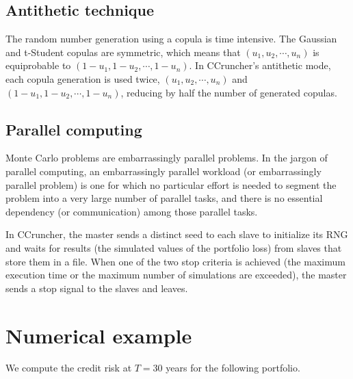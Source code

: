 \documentclass[a4paper,12pt,final]{article}
\begin{document}
\subsection{Antithetic technique}
The random number generation using a copula is time intensive. The Gaussian and 
t-Student copulas are symmetric, which means that $(u_1, u_2, \cdots, u_n)$ is 
equiprobable to $(1-u_1, 1-u_2, \cdots, 1-u_n)$. In CCruncher's antithetic mode, 
each copula generation is used twice, $(u_1, u_2, \cdots, u_n)$ and 
$(1-u_1, 1-u_2, \cdots, 1-u_n)$, reducing by half the number of generated
copulas.

\subsection{Parallel computing}
Monte Carlo problems are embarrassingly parallel problems.
In the jargon of parallel computing, an embarrassingly parallel workload 
(or embarrassingly parallel problem) is one for which no particular effort 
is needed to segment the problem into a very large number of parallel tasks, 
and there is no essential dependency (or communication) among those parallel 
tasks.
\newline

In CCruncher, the master sends a distinct seed to each slave to initialize its RNG 
and waits for results (the simulated values of the portfolio loss) from slaves that 
store them in a file. When one of the two stop criteria is achieved (the maximum 
execution time or the maximum number of simulations are exceeded), the master sends 
a stop signal to the slaves and leaves.


\pagebreak
\section{Numerical example}

We compute the credit risk at $T=30$ years for the following portfolio.
\end{document}

